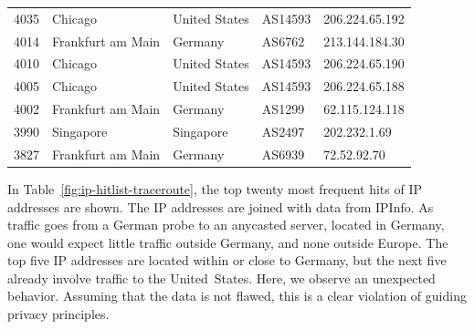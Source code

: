 \begin{table}
\begin{tabular}{rllll}
		4035  & Chicago           & United States & AS14593      & 206.224.65.192  \\
		4014  & Frankfurt am Main & Germany       & AS6762       & 213.144.184.30  \\
		4010  & Chicago           & United States & AS14593      & 206.224.65.190  \\
		4005  & Chicago           & United States & AS14593      & 206.224.65.188  \\
		4002  & Frankfurt am Main & Germany       & AS1299       & 62.115.124.118  \\
		3990  & Singapore         & Singapore     & AS2497       & 202.232.1.69    \\
		3827  & Frankfurt am Main & Germany       & AS6939       & 72.52.92.70     \\
		\bottomrule
	\end{tabular}
\end{table}

In Table~\ref{fig:ip-hitlist-traceroute}, the top twenty most frequent hits of
IP addresses are shown. The IP addresses are joined with data from IPInfo. As
traffic goes from a German probe to an anycasted server, located in Germany,
one would expect little traffic outside Germany, and none outside Europe. The
top five IP addresses are located within or close to Germany, but the next five
already involve traffic to the United~States. Here, we observe an unexpected
behavior. Assuming that the data is not flawed, this is a clear violation of
guiding privacy principles.

